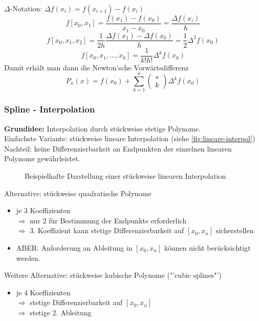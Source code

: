 $\Delta$-Notation: $\Delta f(x_i) = f(x_{i + 1}) - f(x_i)$
\begin{equation}
	f[x_0, x_1] = \frac{f(x_1) - f(x_0)}{x_1 - x_0} = \frac{\Delta f(x_i)}{h}
\end{equation}
\begin{equation}
	f[x_0, x_1, x_2] = \frac{1}{2h} \frac{\Delta f(x_1) - \Delta f(x_0)}{h} = \frac{1}{2} \Delta^2 f(x_0)
\end{equation}
\begin{equation}
	f[x_0, x_1, \ldots, x_k] = \frac{1}{k! h!} \Delta^k f(x_0)
\end{equation}
Damit erhält man dann die Newton'sche Vorwärtsdifferenz
\begin{equation}
	P_n(x) = f(x_0) + \sum_{k = 1}^n \begin{pmatrix} s \\ k \end{pmatrix} \Delta^k f(x_0)
\end{equation}

\subsubsection{Spline - Interpolation}
\textbf{Grundidee:} Interpolation durch stückweise stetige Polynome.\\
Einfachste Variante: stückweise lineare Interpolation (siehe \autoref{fig:lineare-interpol})\\
Nachteil: keine Differenzierbarkeit an Endpunkten der einzelnen linearen Polynome gewährleistet.\\
\begin{figure}[htbp]
\caption{Beispielhafte Darstellung einer stückweise linearen Interpolation}
\label{fig:lineare-interpol}
\end{figure}

Alternative: stückweise quadratische Polynome
\begin{itemize}
	\item je 3 Koeffizienten\\
	$\Rightarrow$ nur 2 für Bestimmung der Endpunkte erforderlich\\
	$\Rightarrow$ 3. Koeffizient kann stetige Differenzierbarkeit auf $[x_0,x_n]$ sicherstellen\\
	\item ABER: Anforderung an Ableitung in $[x_0,x_n]$ können nicht berücksichtigt werden.
\end{itemize}
Weitere Alternative: stückweise kubische Polynome ("'cubic splines"')
\begin{itemize}
	\item je 4 Koeffizienten\\
	$\Rightarrow$ stetige Differenzierbarkeit auf $[x_0,x_n]$ \\
	$\Rightarrow$ stetige 2. Ableitung
\end{itemize}

